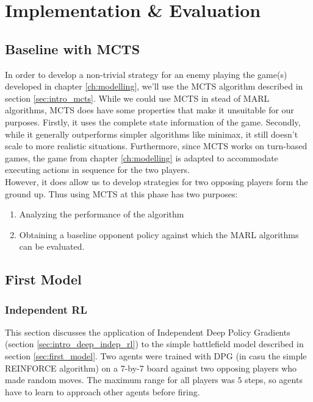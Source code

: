 \chapter{Implementation \& Evaluation}
\label{ch:impl_eval}
\section{Baseline with MCTS}
In order to develop a non-trivial strategy for an enemy playing the game(s) developed in chapter \ref{ch:modelling}, we'll use  the MCTS algorithm described in section \ref{sec:intro_mcts}.
While we could use MCTS in stead of MARL algorithms, MCTS does have some properties that make it unsuitable for our purposes. Firstly, it uses the complete state information of the game. Secondly, while it generally outperforms simpler algorithms like minimax, it still doesn't scale to more realistic situations. Furthermore, since MCTS works on turn-based games, the game from chapter \ref{ch:modelling} is adapted to accommodate executing actions in sequence for the two players.\\

However, it does allow us to develop strategies for two opposing players form the ground up. Thus using MCTS at this phase has two purposes:
\begin{enumerate}
    \item Analyzing the performance of the algorithm
    \item Obtaining a baseline opponent policy against which the MARL algorithms can be evaluated.
\end{enumerate}



\section{First Model}
\subsection{Independent RL}
\label{sec:iql_applied}
This section discusses the application of Independent Deep Policy Gradients (section \ref{sec:intro_deep_indep_rl}) to the simple battlefield model described in section \ref{sec:first_model}. Two agents were trained with DPG (in casu the simple REINFORCE algorithm) on a 7-by-7 board against two opposing players who made random moves. The maximum range for all players was $5$ steps, so agents have to learn to approach other agents before firing.\\

